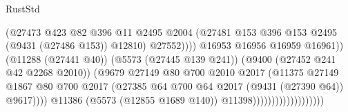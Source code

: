 \begin{lexlean}{RustStd}
\begin{coremodule}
                                                      (@27473
                                                        @423
                                                        @82
                                                        @396
                                                        @11
                                                        @2495
                                                        @2004
                                                        (@27481
                                                          @153
                                                          @396
                                                          @153
                                                          @2495
                                                          (@9431 (@27486 @153))
                                                          @12810)
                                                        @27552))))
                                                @16953
                                                @16956
                                                @16959
                                                @16961))
                                            (@11288 (@27441 @40))
                                            (@5573 (@27445 @139 @241))
                                            (@9400 (@27452 @241 @42 @2268 @2010))
                                            (@9679
                                              @27149
                                              @80
                                              @700
                                              @2010
                                              @2017
                                              (@11375
                                                @27149
                                                @1867
                                                @80
                                                @700
                                                @2017
                                                (@27385
                                                  @64
                                                  @700
                                                  @64
                                                  @2017
                                                  (@9431 (@27390 @64))
                                                  @9617))))
                                          @11386
                                          (@5573 (@12855 @1689 @140))
                                          @11398)))))))))))))))))))

\end{coremodule}
\end{lexlean}

